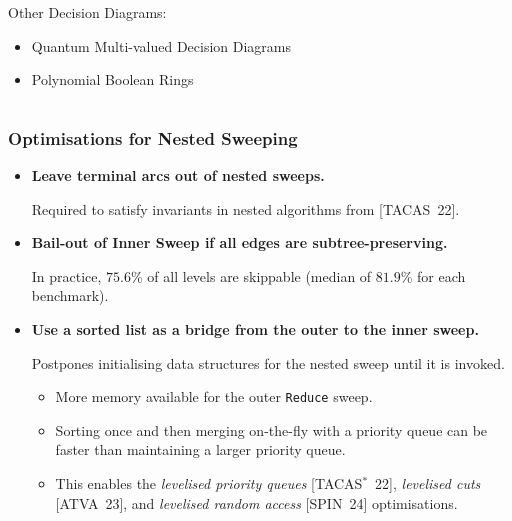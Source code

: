 \documentclass[english, aspectratio=169]{beamer}
\begin{document}
\begin{frame}
\begin{columns}
\begin{column}[t]{0.58\linewidth}
      Other Decision Diagrams:
      \begin{itemize}
      \item[\faIcon{circle}]       Quantum Multi-valued Decision Diagrams
      \item[\faIcon{circle}]       Polynomial Boolean Rings
      \end{itemize}
    \end{column}
  \end{columns}
\end{frame}

\blankframe

\begin{frame}
  \frametitle{Optimisations for Nested Sweeping}

  \begin{itemize}
  \item {\bf Leave terminal arcs out of nested sweeps.}

    {\small Required to satisfy invariants in nested algorithms from [TACAS~22].}

  \item {\bf Bail-out of Inner Sweep if all edges are subtree-preserving.}

    {\small In practice, $75.6\%$ of all levels are skippable (median of $81.9\%$ for each
      benchmark).}

  \item {\bf Use a sorted list as a bridge from the outer to the inner sweep.}

    {\small Postpones initialising data structures for the nested sweep until it is invoked.}
    \begin{itemize}
    \item More memory available for the outer \texttt{Reduce} sweep.
    \item Sorting once and then merging on-the-fly with a priority queue can be faster than
      maintaining a larger priority queue.
    \item This enables the \emph{levelised priority queues} [TACAS$^*$~22], \emph{levelised cuts} [ATVA~23],
      and \emph{levelised random access} [SPIN~24] optimisations.
    \end{itemize}
  \end{itemize}
\end{frame}

\blankframe
\end{document}
